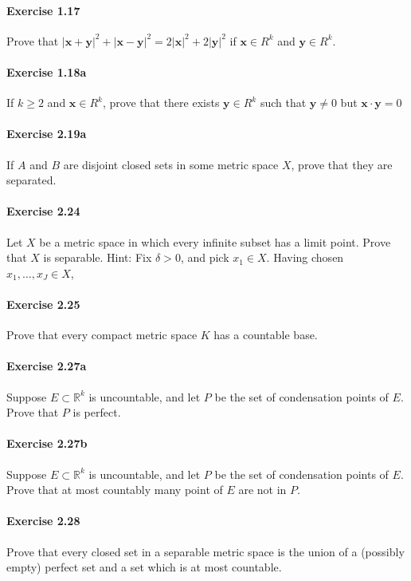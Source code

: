 \documentclass{article}
\begin{document}
\paragraph{Exercise 1.17} Prove that $|\mathbf{x}+\mathbf{y}|^{2}+|\mathbf{x}-\mathbf{y}|^{2}=2|\mathbf{x}|^{2}+2|\mathbf{y}|^{2}$ if $\mathbf{x} \in R^{k}$ and $\mathbf{y} \in R^{k}$.

\paragraph{Exercise 1.18a} If $k \geq 2$ and $\mathbf{x} \in R^{k}$, prove that there exists $\mathbf{y} \in R^{k}$ such that $\mathbf{y} \neq 0$ but $\mathbf{x} \cdot \mathbf{y}=0$

\paragraph{Exercise 2.19a} If $A$ and $B$ are disjoint closed sets in some metric space $X$, prove that they are separated.

\paragraph{Exercise 2.24} Let $X$ be a metric space in which every infinite subset has a limit point. Prove that $X$ is separable. Hint: Fix $\delta>0$, and pick $x_{1} \in X$. Having chosen $x_{1}, \ldots, x_{J} \in X$,

\paragraph{Exercise 2.25} Prove that every compact metric space $K$ has a countable base.

\paragraph{Exercise 2.27a} Suppose $E\subset\mathbb{R}^k$ is uncountable, and let $P$ be the set of condensation points of $E$. Prove that $P$ is perfect.

\paragraph{Exercise 2.27b} Suppose $E\subset\mathbb{R}^k$ is uncountable, and let $P$ be the set of condensation points of $E$. Prove that at most countably many point of $E$ are not in $P$.

\paragraph{Exercise 2.28} Prove that every closed set in a separable metric space is the union of a (possibly empty) perfect set and a set which is at most countable.
\end{document}
